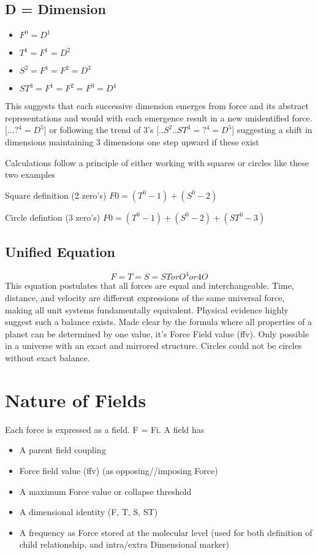 \documentclass[12pt]{thesis}
\begin{document}
\subsection{D = Dimension}
\begin{itemize}
    \item $F^0 = D^1$
    \item $T^1 = F^1 = D^2$
    \item $S^2 = F^1 = F^2 = D^3$
    \item $ST^3 = F^1 = F^2 = F^3 = D^4$
\end{itemize}

\noindent This suggests that each successive dimension emerges from force and its abstract representations and would with each emergence result in a new unidentified force. [$...?^4 = D^5$] or following the trend of 3's [$..S^2..ST^3 = ?^4 = D^5$] suggesting a shift in dimensions maintaining 3 dimensions one step upward if these exist

Calculations follow a principle of either working with squares or circles like these two examples

Square definition (2 zero's)
$F0 = (T^0-1)+(S^0-2)$

Circle defintion (3 zero's)
$F0 = (T^0-1)+(S^0-2)+(ST^0-3)$

\subsection{Unified Equation}
\[
F = T = S = ST or O^4 or 4O
\]
This equation postulates that all forces are equal and interchangeable. Time, distance, and velocity are different expressions of the same universal force, making all unit systems fundamentally equivalent. Physical evidence highly suggest such a balance exists. Made clear by the formula where all properties of a planet can be determined by one value, it's Force Field value (ffv).
Only possible in a universe with an exact and mirrored structure. Circles could not be circles without exact balance.

\section{Nature of Fields}
Each force is expressed as a field. F = Fi. A field has
\begin{itemize}
    \item A parent field coupling
    \item Force field value (ffv) (as opposing//imposing Force)
    \item A maximum Force value or collapse threshold
    \item A dimensional identity (F, T, S, ST)
    \item A frequency as Force stored at the molecular level (used for both definition of child relationship, and intra/extra Dimensional marker)
\end{itemize}
\end{document}
